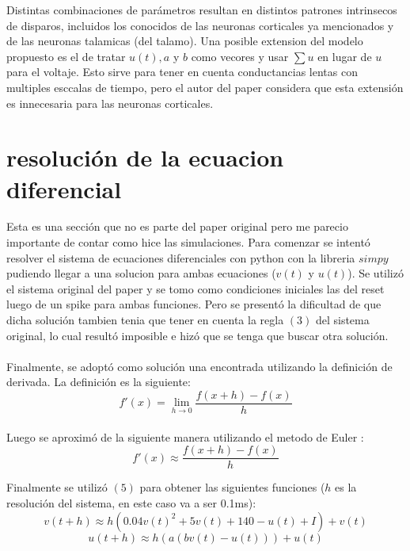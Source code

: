 \documentclass[12pt]{article}
\begin{document}
Distintas combinaciones de parámetros resultan en distintos patrones intrinsecos de disparos, incluidos los conocidos de las neuronas corticales ya mencionados y de las neuronas talamicas (del talamo).
Una posible extension del modelo propuesto es el de tratar $u(t), a$ y $b$ como vecores y usar $\sum{u}$ en lugar de $u$ para el voltaje. Esto sirve para tener en cuenta conductancias lentas con multiples esccalas de tiempo, pero el autor del paper considera que esta extensión es innecesaria para las neuronas corticales.

\section{resolución de la ecuacion diferencial}

Esta es una sección que no es parte del paper original pero me parecio importante de contar como hice las simulaciones. Para comenzar se intentó resolver el sistema de ecuaciones diferenciales con python con la libreria $simpy$ \cite{Sympy}
pudiendo llegar a una solucion para ambas
ecuaciones ($v(t)$ y $u(t)$). Se utilizó el sistema original del paper y se tomo como condiciones iniciales las del reset luego de un spike para ambas funciones.
Pero se presentó la dificultad de que dicha solución tambien tenia que tener en cuenta la regla $(3)$ del sistema original, lo cual resultó imposible e hizó que se tenga que buscar otra solución. \\ \\
Finalmente, se adoptó como solución una encontrada utilizando la definición de derivada. La definición es la siguiente: \\
\begin{equation}
    f'(x) = \lim_{h \to 0} \frac{f(x + h) - f(x)}{h}
\end{equation}
\\
Luego se aproximó de la siguiente manera utilizando el metodo de Euler \cite{Euler}:
\begin{equation}
    f'(x) \approx \frac{f(x + h) - f(x)}{h}
\end{equation}

Finalmente se utilizó $(5)$ para obtener las siguientes funciones ($h$ es la resolución del sistema, en este caso va a ser 0.1ms):
\begin{equation}
    v(t + h) \approx h(0.04 v(t)^2 + 5 v(t) + 140 - u(t) + I) + v(t)
\end{equation}
\begin{equation}
    u(t + h) \approx h(a(b v(t) - u(t))) + u(t)
\end{equation}
\end{document}
